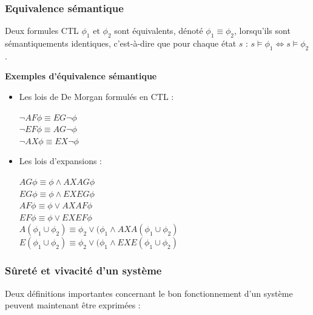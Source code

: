 \documentclass[runningheads,a4paper,10pt]{llncs}
\begin{document}
\subsubsection{Equivalence sémantique} 

Deux formules CTL $\phi_{1}$ et $\phi_{2}$ sont équivalents, dénoté $\phi_{1} \equiv \phi_{2}$, lorsqu'ils sont sémantiquements identiques, c'est-à-dire que pour chaque état $s$ : $s \vDash \phi_{1} \Leftrightarrow s \vDash \phi_{2}$.

\textbf{Exemples d'équivalence sémantique} \\ 

\begin{itemize}
\item Les lois de De Morgan formulés en CTL : \\

\begin{center}
$\neg AF\phi \equiv EG\neg\phi$ \\
$\neg EF\phi \equiv AG\neg\phi$ \\
$\neg AX\phi \equiv EX\neg\phi$ \\
\end{center}

\item Les lois d'expansions : \\

\begin{center}
$ AG\phi \equiv \phi \wedge AXAG\phi$ \\
$ EG\phi \equiv \phi \wedge EXEG\phi$ \\
$ AF\phi \equiv \phi \vee AXAF\phi$ \\
$ EF\phi \equiv \phi \vee EXEF\phi$ \\
$ A(\phi_{1}\cup\phi_{2}) \equiv \phi_{2} \vee (\phi_{1} \wedge AXA(\phi_{1}\cup\phi_{2})$ \\
$ E(\phi_{1}\cup\phi_{2}) \equiv \phi_{2} \vee (\phi_{1} \wedge EXE(\phi_{1}\cup\phi_{2})$ \\
\end{center}

\end{itemize}


\subsubsection{Sûreté et vivacité d'un système}

Deux définitions importantes concernant le bon fonctionnement d'un système peuvent maintenant être exprimées : 
\end{document}
